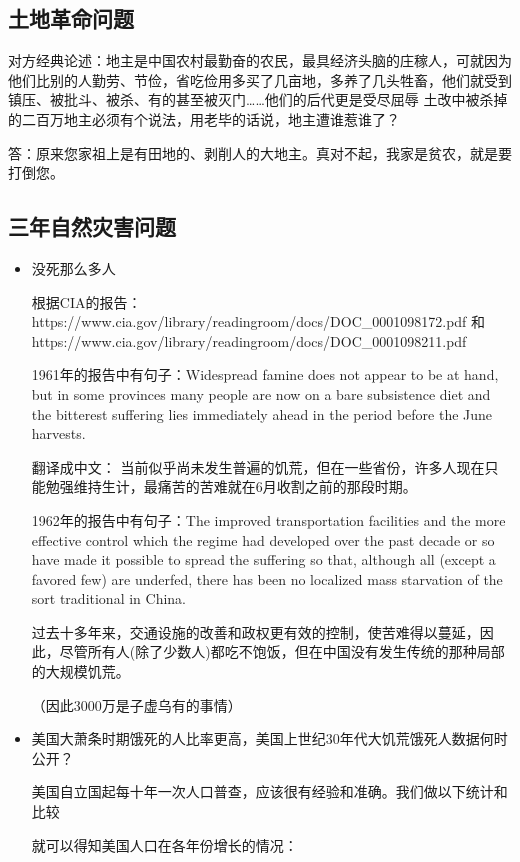 \documentclass[UTF8,a4paper]{ctexart}
\begin{document}
\subsection{土地革命问题}
对方经典论述：地主是中国农村最勤奋的农民，最具经济头脑的庄稼人，可就因为他们比别的人勤劳、节俭，省吃俭用多买了几亩地，多养了几头牲畜，他们就受到镇压、被批斗、被杀、有的甚至被灭门……他们的后代更是受尽屈辱 土改中被杀掉的二百万地主必须有个说法，用老毕的话说，地主遭谁惹谁了？

答：原来您家祖上是有田地的、剥削人的大地主。真对不起，我家是贫农，就是要打倒您。
\subsection{三年自然灾害问题}
\begin{itemize}
    \item 没死那么多人
    
    根据CIA的报告：https://www.cia.gov/library/readingroom/docs/DOC\_0001098172.pdf 和 https://www.cia.gov/library/readingroom/docs/DOC\_0001098211.pdf

    1961年的报告中有句子：Widespread famine does not appear to be at hand, but in some provinces many people are now on a bare subsistence diet and the bitterest suffering lies immediately ahead in the period before the June harvests.

    翻译成中文：
    当前似乎尚未发生普遍的饥荒，但在一些省份，许多人现在只能勉强维持生计，最痛苦的苦难就在6月收割之前的那段时期。

    1962年的报告中有句子：The improved transportation facilities and the more effective control which the regime had developed over the past decade or so have made it possible to spread the suffering so that, although all (except a favored few) are underfed, there has been no localized mass starvation of the sort traditional in China.

    过去十多年来，交通设施的改善和政权更有效的控制，使苦难得以蔓延，因此，尽管所有人(除了少数人)都吃不饱饭，但在中国没有发生传统的那种局部的大规模饥荒。

    （因此3000万是子虚乌有的事情）

    \item 美国大萧条时期饿死的人比率更高，美国上世纪30年代大饥荒饿死人数据何时公开？
    
    美国自立国起每十年一次人口普查，应该很有经验和准确。我们做以下统计和比较
    
    就可以得知美国人口在各年份增长的情况：
    

\end{itemize}
\end{document}

